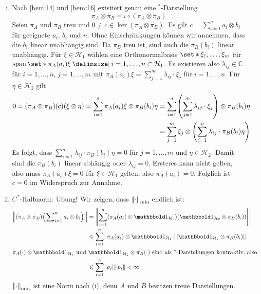\begin{beweis}
	\begin{enumerate}[(i)]
		\item Nach \autoref{bem:14} und \autoref{bem:16} existiert genau eine $^*$-Darstellung 
		\[
			\pi_A \otimes \pi_B = \iota \circ (\pi_A \otimes \pi_B)
		\]
		Seien $\pi_A$ und $\pi_B$ treu und $0 \neq c \in \ker (\pi_A \otimes \pi_B)$.
		Es gilt $c= \sum_{i=1}^{n} a_i \otimes b_i$ für geeignete $a_i$, $b_i$ und $n$.
		Ohne Einschränkungen können wir annehmen, dass die $b_i$ linear unabhängig sind.
		Da $\pi_B$ treu ist, sind auch die $\pi_B(b_i)$ linear unabhängig.
		Für $\xi \in \mathcal{H}_1$ wählen eine Orthonormalbasis $\set*{\xi_1, \ldots ,\xi_m}$ für $\Span \set*{\pi_A(a_i) \xi \given i=1,\ldots ,n} \subset \mathcal{H}_1$.
		Es existieren also $\lambda_{ij} \in \mathbb{C}$ für $i=1,\ldots ,n$, $j=1,\ldots ,m$ mit 
		\(
			\pi_A(a_i) \xi = \sum_{j=1}^{m} \lambda_{ij} \cdot \xi_j
		\)
		für $i=1,\ldots ,n$.
		Für $\eta \in \mathcal{H}_2$ gilt
		\begin{align}
			0 = \enbrace*{\pi_A \otimes \pi_B}(c) \enbrace*{\xi \otimes \eta} = \sum_{i=1}^{n} \pi_A(a_i) \xi \otimes \pi_B(b_i) \eta &= \sum_{i=1}^{n} \enbrace*{\sum_{j=1}^{m} \lambda_{ij} \cdot \xi_j} \otimes \pi_B(b_i) \eta \\
			&= \sum_{j=1}^{m} \xi_j \otimes \enbrace*{\sum_{i=1}^{n} \lambda_{ij} \cdot \pi_B(b_i) \eta }
		\end{align}
		Es folgt, dass $\sum_{i=1}^{n} \lambda_{ij} \cdot \pi_B(b_i) \eta=0$ für $j=1,\ldots ,m$ und $\eta \in \mathcal{H}_2$.
		Damit sind die $\pi_B(b_i)$ linear abhängig oder $\lambda_{ij}=0$.
		Ersteres kann nicht gelten, also muss $\pi_A(a_i)\xi=0$ für $\xi \in \mathcal{H}_1$ gelten, also $\pi_A(a_i)=0$.
		Folglich ist $c=0$ im Widerspruch zur Annahme.
		\item $C^*$-Halbnorm: Übung!
		Wir zeigen, dass $\norm*{\cdot }_{\min}$ endlich ist: 
		\begin{align}
			\norm*{\enbrace*{\pi_A \otimes \pi_B} \enbrace*{\sum\nolimits_{i=1}^{n} a_i \otimes b_i}} &= \norm*{\sum_{i=1}^{n} \enbrace*{\pi_A(a_i) \otimes \ind_{\mathcal{H}_1} } \enbrace*{\ind_{\mathcal{H}_2} \otimes \pi_B(b_i)}}\\
			&\le \sum_{i=1}^{n} \norm*{\pi_A(a_i) \otimes \ind_{\mathcal{H}_1}} \norm*{\ind_{\mathcal{H}_2} \otimes \pi_B(b_i)} \\
			\intertext{$\pi_A(\cdot ) \otimes \ind_{\mathcal{H}_1}$ und $\ind_{\mathcal{H}_2} \otimes \pi_B(\cdot )$ sind als $^*$-Darstellungen kontraktiv, also}
			&\le \sum_{i=1}^{n} \norm*{a_i} \norm*{b_i} < \infty
		\end{align}
		$\norm*{\cdot }_{\min}$ ist eine Norm nach (i), denn $A$ und $B$ besitzen treue Darstellungen.\qedhere
	\end{enumerate}
\end{beweis}

